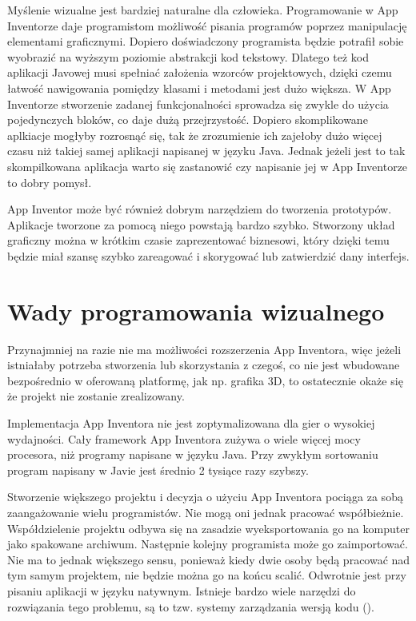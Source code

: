 Myślenie wizualne jest bardziej naturalne dla człowieka. Programowanie w App Inventorze daje programistom możliwość pisania programów poprzez manipulację elementami graficznymi. Dopiero doświadczony programista będzie potrafił sobie wyobrazić na wyższym poziomie abstrakcji kod tekstowy. Dlatego też kod aplikacji Javowej musi spełniać założenia wzorców projektowych, dzięki czemu łatwość nawigowania pomiędzy klasami i metodami jest dużo większa. W App Inventorze stworzenie zadanej funkcjonalności sprowadza się zwykle do użycia pojedynczych bloków, co daje dużą przejrzystość. Dopiero skomplikowane aplkiacje mogłyby rozrosnąć się, tak że zrozumienie ich zajełoby dużo więcej czasu niż takiej samej aplikacji napisanej w języku Java. Jednak jeżeli jest to tak skompilkowana aplikacja warto się zastanowić czy napisanie jej w App Inventorze to dobry pomysł.

App Inventor może być również dobrym narzędziem do tworzenia prototypów. Aplikacje tworzone za pomocą niego powstają bardzo szybko. Stworzony układ graficzny można w krótkim czasie zaprezentować biznesowi, który dzięki temu będzie miał szansę szybko zareagować i skorygować lub zatwierdzić dany interfejs.

\section{Wady programowania wizualnego}

Przynajmniej na razie nie ma możliwości rozszerzenia App Inventora, więc jeżeli istniałaby potrzeba stworzenia lub skorzystania z czegoś, co nie jest wbudowane bezpośrednio w oferowaną platformę, jak np. grafika 3D, to ostatecznie okaże się że projekt nie zostanie zrealizowany.

Implementacja App Inventora nie jest zoptymalizowana dla gier o wysokiej wydajności. Cały framework App Inventora zużywa o wiele więcej mocy procesora, niż programy napisane w języku Java. Przy zwykłym sortowaniu program napisany w Javie jest średnio 2 tysiące razy szybszy.

Stworzenie większego projektu i decyzja o użyciu App Inventora pociąga za sobą zaangażowanie wielu programistów. Nie mogą oni jednak pracować współbieżnie. Współdzielenie projektu odbywa się na zasadzie wyeksportowania go na komputer jako spakowane archiwum. Następnie kolejny programista może go zaimportować. Nie ma to jednak większego sensu, ponieważ kiedy dwie osoby będą pracować nad tym samym projektem, nie będzie można go na końcu scalić. Odwrotnie jest przy pisaniu aplikacji w języku natywnym. Istnieje bardzo wiele narzędzi do rozwiązania tego problemu, są to tzw. systemy zarządzania wersją kodu ().

